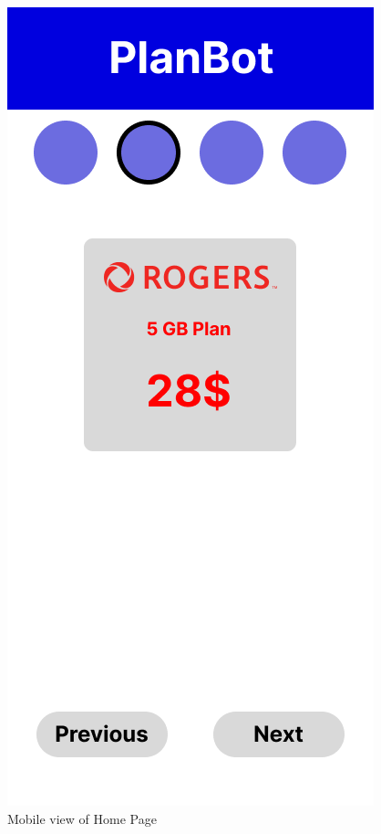 \documentclass[conference]{IEEEtran}
\begin{document}
\begin{figure}[H]
    \centering
    \includegraphics[width=1\linewidth]{Mobile/Group 16MOBILE.png}
    \caption{Mobile view of Home Page}
    \label{fig:user flow}
\end{figure}
\end{document}
